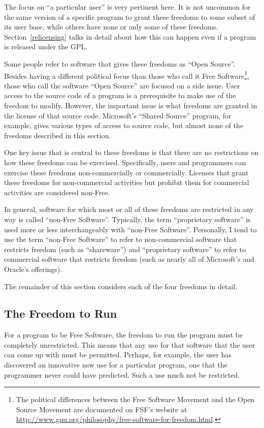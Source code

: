 \documentclass[12pt]{report}
\begin{document}
The focus on ``a particular user'' is very pertinent here.  It is not
uncommon for the same version of a specific program to grant these
freedoms to some subset of its user base, while others have none or only
some of these freedoms.  Section~\ref{relicensing} talks in detail about
how this can happen even if a program is released under the GPL\@.

Some people refer to software that gives these freedoms as ``Open
Source''.  Besides having a different political focus than those who call
it Free Software\footnote{The political differences between the Free
Software Movement and the Open Source Movement are documented on FSF's
website at
\href{http://www.fsf.org/philosophy/free-software-for-freedom.html}
{http://www.gnu.org/philosophy/free-software-for-freedom.html}.},
those who call the software ``Open Source'' are focused on a side issue.
User access to the source code of a program is a prerequisite to make use
of the freedom to modify.  However, the important issue is what freedoms
are granted in the license of that source code.  Microsoft's ``Shared
Source'' program, for example, gives various types of access to source
code, but almost none of the freedoms described in this section.

One key issue that is central to these freedoms is that there are no
restrictions on how these freedoms can be exercised.  Specifically, users
and programmers can exercise these freedoms non-commercially or
commercially.  Licenses that grant these freedoms for non-commercial
activities but prohibit them for commercial activities are considered
non-Free.

In general, software for which most or all of these freedoms are
restricted in any way is called ``non-Free Software''.  Typically, the
term ``proprietary software'' is used more or less interchangeably with
``non-Free Software''.  Personally, I tend to use the term ``non-Free
Software'' to refer to non-commercial software that restricts freedom
(such as ``shareware'') and ``proprietary software'' to refer to
commercial software that restricts freedom (such as nearly all of
Microsoft's and Oracle's offerings).

The remainder of this section considers each of the four freedoms in
detail.

\subsection{The Freedom to Run}

For a program to be Free Software, the freedom to run the program must be
completely unrestricted.  This means that any use for that software that
the user can come up with must be permitted.  Perhaps, for example, the
user has discovered an innovative new use for a particular program, one
that the programmer never could have predicted.  Such a use much not be
restricted.
\end{document}
